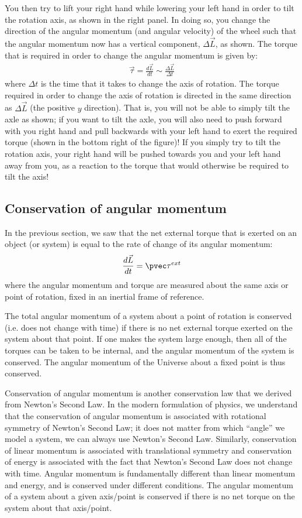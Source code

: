 You then try to lift your right hand while lowering your left hand in order to tilt the rotation axis, as shown in the right panel. In doing so, you change the direction of the angular momentum (and angular velocity) of the wheel such that the angular momentum now has a vertical component, $\Delta \vec L$, as shown. The torque that is required in order to change the angular momentum is given by:
\begin{align*}
\vec \tau = \frac{d\vec L}{dt} \sim \frac{\Delta \vec L}{\Delta t}
\end{align*}
where $\Delta t$ is the time that it takes to change the axis of rotation. The torque required in order to change the axis of rotation is directed in the same direction as $\Delta \vec L$ (the positive $y$ direction). That is, you will not be able to simply tilt the axle as shown; if you want to tilt the axle, you will also need to push forward with you right hand and pull backwards with your left hand to exert the required torque (shown in the bottom right of the figure)! If you simply try to tilt the rotation axis, your right hand will be pushed towards you and your left hand away from you, as a reaction to the torque that would otherwise be required to tilt the axis!

\subsection{Conservation of angular momentum}
In the previous section, we saw that the net external torque that is exerted on an object (or system) is equal to the rate of change of its angular momentum:
\begin{align*}
\frac{d\vec L}{dt} = \pvec \tau^{ext}
\end{align*}
where the angular momentum and torque are measured about the same axis or point of rotation, fixed in an inertial frame of reference.

The total angular momentum of a system about a point of rotation is conserved (i.e. does not change with time) if there is no net external torque exerted on the system about that point. If one makes the system large enough, then all of the torques can be taken to be internal, and the angular momentum of the system is conserved. The angular momentum of the Universe about a fixed point is thus conserved.

Conservation of angular momentum is another conservation law that we derived from Newton's Second Law. In the modern formulation of physics, we understand that the conservation of angular momentum is associated with rotational symmetry of Newton's Second Law; it does not matter from which ``angle'' we model a system, we can always use Newton's Second Law. Similarly, conservation of linear momentum is associated with translational symmetry and conservation of energy is associated with the fact that Newton's Second Law does not change with time. Angular momentum is fundamentally different than linear momentum and energy, and is conserved under different conditions. The angular momentum of a system about a given axis/point is conserved if there is no net torque on the system about that axis/point.


